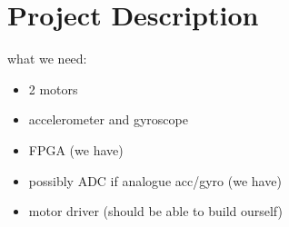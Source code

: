 \section*{Project Description}





what we need:

\begin{itemize}
\item 2 motors
\item accelerometer and gyroscope
\item FPGA (we have)
\item possibly ADC if analogue acc/gyro (we have)
\item motor driver (should be able to build ourself)
\end{itemize}
